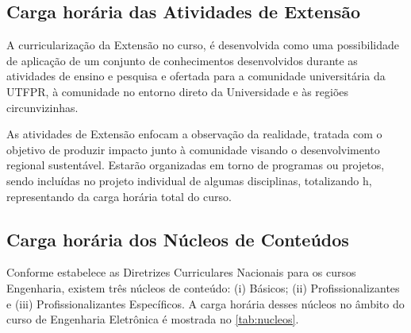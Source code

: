 




\subsection{Carga horária das Atividades de Extensão}
\label{sub:extch}

A curricularização da Extensão no curso, é desenvolvida como uma possibilidade de aplicação de um conjunto de conhecimentos desenvolvidos durante as atividades de ensino e pesquisa e ofertada para a comunidade universitária da UTFPR, à comunidade no entorno direto da Universidade e às regiões circunvizinhas.

As atividades de Extensão enfocam a observação da realidade, tratada com o objetivo de produzir impacto junto à comunidade visando o desenvolvimento regional sustentável. Estarão organizadas em torno de programas ou projetos, sendo incluídas no projeto individual de algumas disciplinas, totalizando \the\value{horasEXT} h, representando \percentagem{\the\value{horasEXT}}{\the\value{horasT}} da carga horária total do curso.

\subsection{Carga horária dos Núcleos de Conteúdos}
\label{subsec:nucleos}

Conforme estabelece as Diretrizes Curriculares Nacionais para os cursos Engenharia, existem três núcleos de conteúdo: (i) Básicos; (ii) Profissionalizantes e (iii) Profissionalizantes Específicos. A carga horária desses núcleos no âmbito do curso de Engenharia Eletrônica é mostrada no \autoref{tab:nucleos}.

